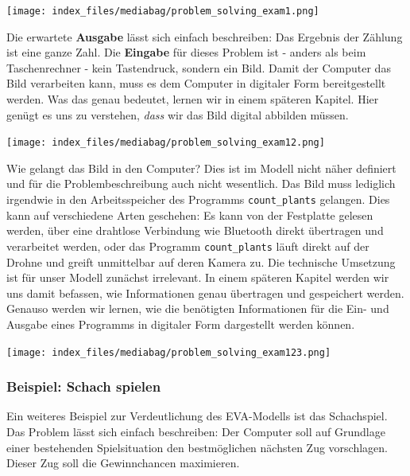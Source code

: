 \documentclass[
  letterpaper,
  DIV=11]{scrreprt}
\begin{document}
\begin{center}
\texttt{[image: index\_files/mediabag/problem\_solving\_exam1.png]}
\end{center}

Die erwartete \textbf{Ausgabe} lässt sich einfach beschreiben: Das
Ergebnis der Zählung ist eine ganze Zahl. Die \textbf{Eingabe} für
dieses Problem ist - anders als beim Taschenrechner - kein Tastendruck,
sondern ein Bild. Damit der Computer das Bild verarbeiten kann, muss es
dem Computer in digitaler Form bereitgestellt werden. Was das genau
bedeutet, lernen wir in einem späteren Kapitel. Hier genügt es uns zu
verstehen, \emph{dass }wir das Bild digital abbilden müssen.

\begin{center}
\texttt{[image: index\_files/mediabag/problem\_solving\_exam12.png]}
\end{center}

Wie gelangt das Bild in den Computer? Dies ist im Modell nicht näher
definiert und für die Problembeschreibung auch nicht wesentlich. Das
Bild muss lediglich irgendwie in den Arbeitsspeicher des Programms
\texttt{count\_plants} gelangen. Dies kann auf verschiedene Arten
geschehen: Es kann von der Festplatte gelesen werden, über eine
drahtlose Verbindung wie Bluetooth direkt übertragen und verarbeitet
werden, oder das Programm \texttt{count\_plants} läuft direkt auf der
Drohne und greift unmittelbar auf deren Kamera zu. Die technische
Umsetzung ist für unser Modell zunächst irrelevant. In einem späteren
Kapitel werden wir uns damit befassen, wie Informationen genau
übertragen und gespeichert werden. Genauso werden wir lernen, wie die
benötigten Informationen für die Ein- und Ausgabe eines Programms in
digitaler Form dargestellt werden können.

\begin{center}
\texttt{[image: index\_files/mediabag/problem\_solving\_exam123.png]}
\end{center}

\subsubsection{Beispiel: Schach spielen}\label{beispiel-schach-spielen}

Ein weiteres Beispiel zur Verdeutlichung des EVA-Modells ist das
Schachspiel. Das Problem lässt sich einfach beschreiben: Der Computer
soll auf Grundlage einer bestehenden Spielsituation den bestmöglichen
nächsten Zug vorschlagen. Dieser Zug soll die Gewinnchancen maximieren.
\end{document}

